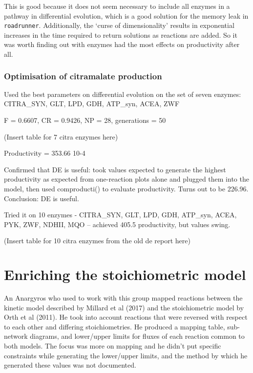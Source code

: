 \documentclass[parskip=full]{scrreprt}
\begin{document}
This is good because it does not seem necessary to include all enzymes in a pathway in differential evolution, which is a good solution for the memory leak in \texttt{roadrunner}. Additionally, the `curse of dimensionality' results in exponential increases in the time required to return solutions as reactions are added. So it was worth finding out with enzymes had the most effects on productivity after all.

\subsection{Optimisation of citramalate production}
\label{ssec:optcitra}

Used the best parameters on differential evolution on the set of seven enzymes: CITRA\_SYN, GLT, LPD, GDH, ATP\_syn, ACEA, ZWF

F = 0.6607, CR = 0.9426, NP = 28, generations = 50

(Insert table for 7 citra enzymes here)

Productivity = 353.66 10-4

Confirmed that DE is useful: took values expected to generate the highest productivity as expected from one-reaction plots alone and plugged them into the model, then used comproducti() to evaluate productivity. Turns out to be 226.96. Conclusion: DE is useful.

Tried it on 10 enzymes - CITRA\_SYN, GLT, LPD, GDH, ATP\_syn, ACEA, PYK, ZWF, NDHII, MQO -- achieved 405.5 productivity, but values swing.

(Insert table for 10 citra enzymes from the old de report here)

\chapter{Enriching the stoichiometric model}
\label{ch:stoich}

An Anargyros who used to work with this group mapped reactions between the kinetic model described by Millard et al (2017) and the stoichiometric model by Orth et al (2011). He took into account reactions that were reversed with respect to each other and differing stoichiometries. He produced a mapping table, sub-network diagrams, and lower/upper limits for fluxes of each reaction common to both models. The focus was more on mapping and he didn’t put specific constraints while generating the lower/upper limits, and the method by which he generated these values was not documented.
\end{document}
